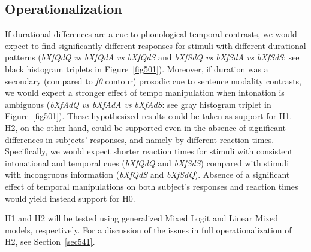 \subsection{Operationalization}\label{sec521}
If durational differences are a cue to phonological temporal contrasts, we would expect to find significantly different responses for stimuli with different durational patterns (\textit{bXfQdQ vs bXfQdA vs bXfQdS} and \textit{bXfSdQ vs bXfSdA vs bXfSdS}: see black histogram triplets in Figure~\ref{fig501}). Moreover, if duration was a secondary (compared to \textit{f0} contour) prosodic cue to sentence modality contrasts, we would expect a stronger effect of tempo manipulation when intonation is ambiguous (\textit{bXfAdQ vs bXfAdA vs bXfAdS}: see gray histogram triplet in Figure~\ref{fig501}). These hypothesized results could be taken as support for H1. H2, on the other hand, could be supported even in the absence of significant differences in subjects’ responses, and namely by different reaction times. Specifically, we would expect shorter reaction times for stimuli with consistent intonational and temporal cues (\textit{bXfQdQ} and \textit{bXfSdS}) compared with stimuli with incongruous information (\textit{bXfQdS} and \textit{bXfSdQ}). Absence of a significant effect of temporal manipulations on both subject's responses and reaction times would yield instead support for H0.

H1 and H2 will be tested using generalized Mixed Logit and Linear Mixed models, respectively. For a discussion of the issues in  full operationalization of H2, see Section~\ref{sec541}.

